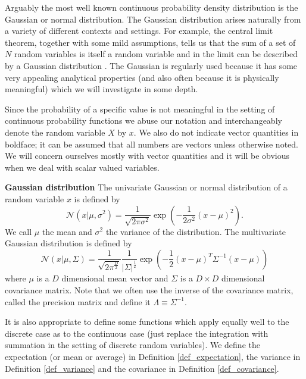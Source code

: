 Arguably the most well known continuous probability density distribution is the Gaussian or normal distribution. The Gaussian distribution arises naturally from a variety of different contexts and settings. For example, the central limit theorem, together with some mild assumptions, tells us that the sum of a set of $N$ random  variables is itself a random variable and in the limit can be described by a Gaussian distribution \cite{bishop}. The Gaussian is regularly used because it has some very appealing analytical properties (and also often because it is physically meaningful) which we will investigate in some depth. 

Since the probability of a specific value is not meaningful in the setting of continuous probability functions we abuse our notation and interchangeably denote the random variable $X$ by $x$. We also do not indicate vector quantities in boldface; it can be assumed that all numbers are vectors unless otherwise noted. We will concern ourselves mostly with vector quantities and it will be obvious when we deal with scalar valued variables. 
\begin{defn}
\textbf{Gaussian distribution} The univariate Gaussian or normal distribution of a random variable $x$ is defined by
\begin{equation}
\mathcal{N}(x|\mu, \sigma^2) = \frac{1}{\sqrt{2\pi\sigma^2}}\exp\left(-\frac{1}{2\sigma^2}(x-\mu)^2\right).
\label{eq_norm_uni}
\end{equation}
We call $\mu$ the mean and $\sigma^2$ the variance of the distribution. The multivariate Gaussian distribution is defined by
\begin{equation}
\mathcal{N}(x|\mu, \Sigma) = \frac{1}{\sqrt{2\pi^{\frac{D}{2}}}}\frac{1}{|\Sigma|^{\frac{1}{2}}}\exp\left(-\frac{1}{2}(x-\mu)^T\Sigma^{-1}(x-\mu)\right)
\label{eq_norm_multi}
\end{equation}
where $\mu$ is a $D$ dimensional mean vector and $\Sigma$ is a $D \times D$ dimensional covariance matrix. Note that we often use the inverse of the covariance matrix, called the precision matrix and define it $\Lambda \equiv \Sigma^{-1}$.
\label{defn_gauss}
\end{defn}
It is also appropriate to define some functions which apply equally well to the discrete case as to the continuous case (just replace the integration with summation in the setting of discrete random variables). We define the expectation (or mean or average) in Definition \ref{def_expectation}, the variance in Definition \ref{def_variance} and the covariance in Definition \ref{def_covariance}. 
